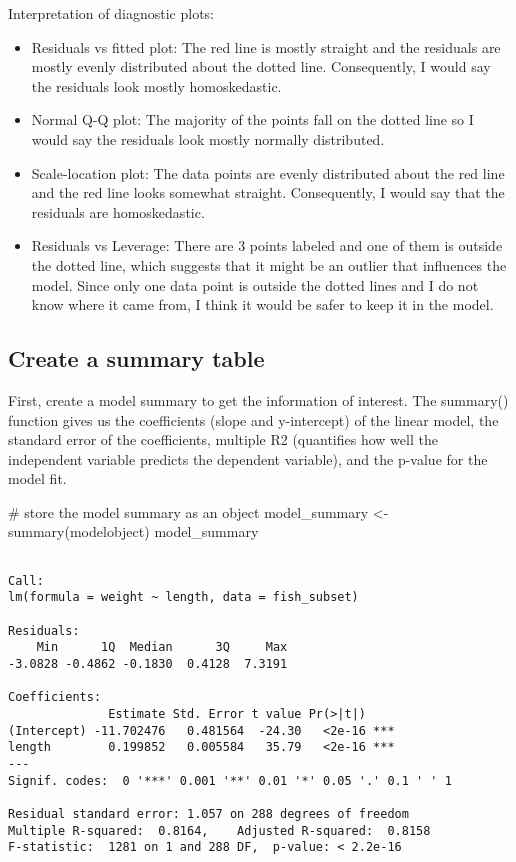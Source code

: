 \documentclass[
  letterpaper,
  DIV=11,
  numbers=noendperiod]{scrartcl}
\newenvironment{Shaded}{\begin{snugshade}}{\end{snugshade}}
\newcommand{\CommentTok}[1]{\textcolor[rgb]{0.37,0.37,0.37}{#1}}
\newcommand{\FunctionTok}[1]{\textcolor[rgb]{0.28,0.35,0.67}{#1}}
\newcommand{\NormalTok}[1]{\textcolor[rgb]{0.00,0.23,0.31}{#1}}
\newcommand{\OtherTok}[1]{\textcolor[rgb]{0.00,0.23,0.31}{#1}}
\providecommand{\tightlist}{%
  \setlength{\itemsep}{0pt}\setlength{\parskip}{0pt}}\usepackage{longtable,booktabs,array}
\begin{document}
Interpretation of diagnostic plots:

\begin{itemize}
\tightlist
\item
  Residuals vs fitted plot: The red line is mostly straight and the
  residuals are mostly evenly distributed about the dotted line.
  Consequently, I would say the residuals look mostly homoskedastic.
\item
  Normal Q-Q plot: The majority of the points fall on the dotted line so
  I would say the residuals look mostly normally distributed.
\item
  Scale-location plot: The data points are evenly distributed about the
  red line and the red line looks somewhat straight. Consequently, I
  would say that the residuals are homoskedastic.
\item
  Residuals vs Leverage: There are 3 points labeled and one of them is
  outside the dotted line, which suggests that it might be an outlier
  that influences the model. Since only one data point is outside the
  dotted lines and I do not know where it came from, I think it would be
  safer to keep it in the model.
\end{itemize}

\hypertarget{create-a-summary-table}{%
\subsection{Create a summary table}\label{create-a-summary-table}}

First, create a model summary to get the information of interest. The
summary() function gives us the coefficients (slope and y-intercept) of
the linear model, the standard error of the coefficients, multiple R2
(quantifies how well the independent variable predicts the dependent
variable), and the p-value for the model fit.

\begin{Shaded}
\begin{Highlighting}[]
\CommentTok{\# store the model summary as an object}
\NormalTok{model\_summary }\OtherTok{\textless{}{-}} \FunctionTok{summary}\NormalTok{(modelobject)}
\NormalTok{model\_summary}
\end{Highlighting}
\end{Shaded}

\begin{verbatim}

Call:
lm(formula = weight ~ length, data = fish_subset)

Residuals:
    Min      1Q  Median      3Q     Max 
-3.0828 -0.4862 -0.1830  0.4128  7.3191 

Coefficients:
              Estimate Std. Error t value Pr(>|t|)    
(Intercept) -11.702476   0.481564  -24.30   <2e-16 ***
length        0.199852   0.005584   35.79   <2e-16 ***
---
Signif. codes:  0 '***' 0.001 '**' 0.01 '*' 0.05 '.' 0.1 ' ' 1

Residual standard error: 1.057 on 288 degrees of freedom
Multiple R-squared:  0.8164,    Adjusted R-squared:  0.8158 
F-statistic:  1281 on 1 and 288 DF,  p-value: < 2.2e-16
\end{verbatim}
\end{document}
